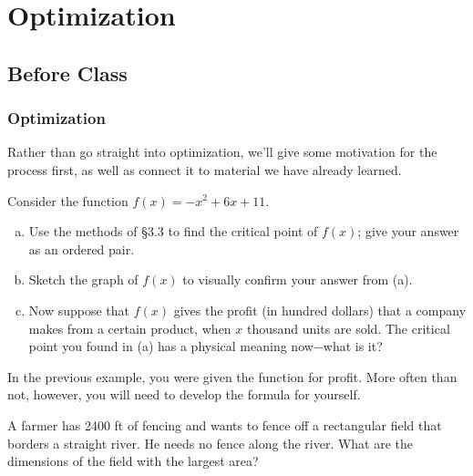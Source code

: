 \documentclass[notes]{subfiles}
\begin{document}
	\setcounter{section}{7}
	\fancyhead[LO,RE]{\bfseries \currentname}
	\fancyfoot[C]{{}}
	\fancyfoot[RO,LE]{\large \thepage}	%
	
\section*{Optimization}\label{cs37}
	\subsection*{Before Class}
	\subsubsection*{Optimization}
		Rather than go straight into optimization, we'll give some motivation for the process first, as well as connect it to material we have already learned.
		\begin{ex}
			Consider the function $f(x) = -x^2 + 6x + 11$.
			\begin{enumerate}[(a)]
				\item Use the methods of \S3.3 to find the critical point of $f(x)$; give your answer as an ordered pair.
					
				\item Sketch the graph of $f(x)$ to visually confirm your answer from (a).
					
				\item Now suppose that $f(x)$ gives the profit (in hundred dollars) that a company makes from a certain product, when $x$ thousand units are sold.  The critical point you found in (a) has a physical meaning now$-$what is it?
			\end{enumerate}
		\end{ex}
			\newpage
		
		In the previous example, you were given the function for profit.  More often than not, however, you will need to develop the formula for yourself.  		
		\begin{ex}
			 A farmer has 2400 ft of fencing and wants to fence off a rectangular field that borders a straight river.  He needs no fence along the river.  What are the dimensions of the field with the largest area?
		\end{ex}
			\vs{1}
			\newpage
			
\end{document}

